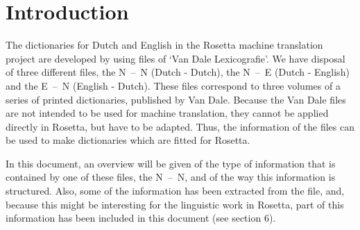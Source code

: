 
   \RosSupersedes{-}
   \MakeRosTitle
%
%

\newcommand{\male}{
   \setlength{\unitlength}{.7ex}
   \begin{picture}(5,4)(1,1)
   \thicklines
   \put(2,2){\circle{2}}
   \thinlines
   \put(3.4,3.4){\vector(1,1){1.5}}
   \put(3.1,3.1){\circle*{0.1}}
   \put(3.2,3.2){\circle*{0.1}}
   \put(3.3,3.3){\circle*{0.1}}
   \put(3.4,3.4){\circle*{0.1}}
   \put(3.5,3.5){\circle*{0.1}}
   \put(3.6,3.6){\circle*{0.1}}
   \put(3.7,3.7){\circle*{0.1}}
   \put(3.8,3.8){\circle*{0.1}}
   \put(3.9,3.9){\circle*{0.1}}
   \put(4,4){\circle*{0.1}}
   \end{picture}
                  }

\newcommand{\female}{
   \setlength{\unitlength}{.7ex}
   \begin{picture}(5,4)(1,1)
   \thicklines
   \put(2,3.1){\circle{2}}
   \put(2,0){\line(0,1){2}}
   \put(1,1){\line(1,0){2}}
   \thinlines
   \end{picture}
                    }

\section{Introduction}
The dictionaries for Dutch and English in the Rosetta machine translation 
project are developed by using files of `Van Dale Lexicografie'.
We have disposal of three different files, the N~--~N (Dutch - Dutch), the 
N~--~E
(Dutch - English) and the E~--~N (English - Dutch). These files correspond to 
three volumes of a series of printed dictionaries, published by Van Dale.
Because the Van Dale files are not intended to be used for machine translation,
they cannot be applied directly in Rosetta, but have to be adapted.
Thus, the information of the files can be used to make dictionaries which are 
fitted for Rosetta. 

In this document, an overview will be given of the type of 
information that is contained by one of these files, the N~--~N, and of the way
this information is structured. Also, some of the information has been 
extracted from the file, and, because this might be interesting for the
linguistic work in Rosetta, part of this information has been included in this 
document (see section 6).
\newpage

